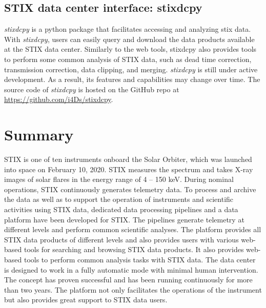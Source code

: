 \documentclass[referee]{aa} %
\begin{document}
\subsection{STIX data center interface:  stixdcpy}
{\it stixdcpy} is a python package that facilitates accessing and analyzing stix data. 
With {\it stixdcpy}, users can easily query and download the data products available at the STIX data center.
Similarly to the web tools, stixdcpy also provides tools to perform some common analysis of STIX data, such as dead time correction, transmission correction, data clipping, and merging. 
{\it stixdcpy} is still under active development. 
As a result, its features and 
capabilities may change over time.  The source code of {\it stixdcpy} is hosted on the GitHub repo at \url{https://github.com/i4Ds/stixdcpy}.
\section{Summary}
\label{sec:summary}
STIX is one of ten instruments onboard the Solar Orbiter, 
which was launched into space on February 10, 2020.
 STIX measures the spectrum and takes X-ray images of solar 
 flares in the energy range of 4 -- 150 keV.  
 During nominal operations, STIX continuously generates telemetry data. 
 To process and archive the data as well as to support the operation of 
 instruments and scientific activities using STIX data, 
 dedicated data processing pipelines and a data platform have been 
 developed for STIX.
 The pipelines generate telemetry at different levels and perform common scientific analyses. 
 The platform provides 
 all STIX data products of different levels and also provides users 
 with various web-based tools for searching and browsing STIX data products. 
 It also provides web-based tools to perform common analysis tasks with STIX data. 
  The data center is designed to work in a 
 fully automatic mode with minimal human intervention. The concept has proven successful 
 and has been running continuously for more than two years.
The platform not only facilitates the operations of the instrument but also provides great support to STIX data users.





\end{document}

